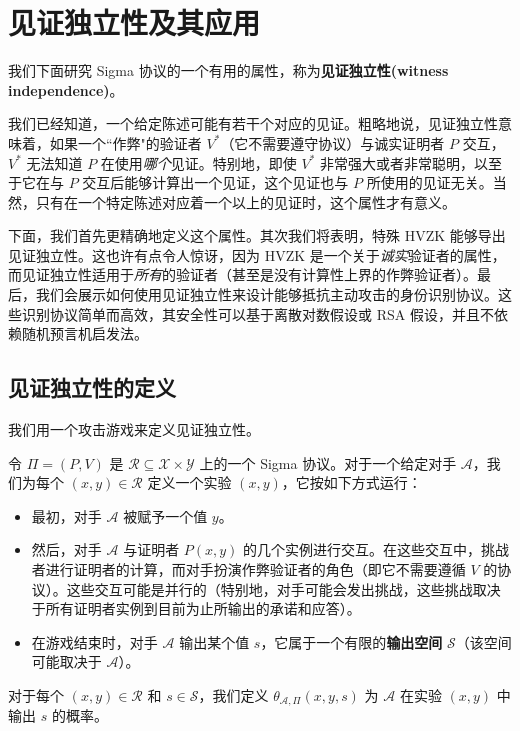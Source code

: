 \section{见证独立性及其应用}

我们下面研究 Sigma 协议的一个有用的属性，称为\textbf{见证独立性(witness independence)}。

我们已经知道，一个给定陈述可能有若干个对应的见证。粗略地说，见证独立性意味着，如果一个``作弊"的验证者 $V^*$（它不需要遵守协议）与诚实证明者 $P$ 交互，$V^*$ 无法知道 $P$ 在使用\emph{哪个}见证。特别地，即使 $V^*$ 非常强大或者非常聪明，以至于它在与 $P$ 交互后能够计算出一个见证，这个见证也与 $P$ 所使用的见证无关。当然，只有在一个特定陈述对应着一个以上的见证时，这个属性才有意义。

下面，我们首先更精确地定义这个属性。其次我们将表明，特殊 HVZK 能够导出见证独立性。这也许有点令人惊讶，因为 HVZK 是一个关于\emph{诚实}验证者的属性，而见证独立性适用于\emph{所有}的验证者（甚至是没有计算性上界的作弊验证者）。最后，我们会展示如何使用见证独立性来设计能够抵抗主动攻击的身份识别协议。这些识别协议简单而高效，其安全性可以基于离散对数假设或 RSA 假设，并且不依赖随机预言机启发法。

\subsection{见证独立性的定义}

我们用一个攻击游戏来定义见证独立性。

\begin{game}[见证独立性]\label{game:19-3}
令 $\Pi=(P,V)$ 是 $\mathcal{R}\subseteq\mathcal{X}×\mathcal{Y}$ 上的一个 Sigma 协议。对于一个给定对手 $\mathcal{A}$，我们为每个 $(x,y)\in\mathcal{R}$ 定义一个实验 $(x,y)$，它按如下方式运行：
\begin{itemize}
	\item 最初，对手 $\mathcal{A}$ 被赋予一个值 $y$。
	\item 然后，对手 $\mathcal{A}$ 与证明者 $P(x,y)$ 的几个实例进行交互。在这些交互中，挑战者进行证明者的计算，而对手扮演作弊验证者的角色（即它不需要遵循 $V$ 的协议）。这些交互可能是并行的（特别地，对手可能会发出挑战，这些挑战取决于所有证明者实例到目前为止所输出的承诺和应答）。
	\item 在游戏结束时，对手 $\mathcal{A}$ 输出某个值 $s$，它属于一个有限的\textbf{输出空间} $\mathcal{S}$（该空间可能取决于 $\mathcal{A}$）。
\end{itemize}
对于每个 $(x,y)\in\mathcal{R}$ 和 $s\in\mathcal{S}$，我们定义 $\theta_{\mathcal{A},\Pi}(x,y,s)$ 为 $\mathcal{A}$ 在实验 $(x,y)$ 中输出 $s$ 的概率。
\end{game}

